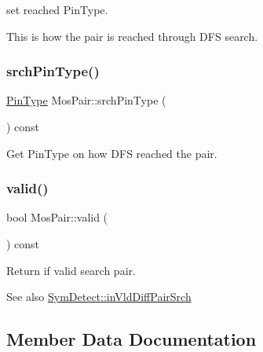 set reached Pin\+Type. 

This is how the pair is reached through D\+FS search. \mbox{\label{classMosPair_a85a281d835a1046346b621ac6c3c6770}} 
\subsubsection{\texorpdfstring{srch\+Pin\+Type()}{srchPinType()}}
{\footnotesize\ttfamily \hyperlink{type_8h_afaab50027002ecbb6c8ac27e727d1bb4}{Pin\+Type} Mos\+Pair\+::srch\+Pin\+Type (\begin{DoxyParamCaption}{ }\end{DoxyParamCaption}) const\hspace{0.3cm}{\ttfamily [inline]}}



Get Pin\+Type on how D\+FS reached the pair. 

\mbox{\label{classMosPair_a16696e5a4fa38118f88549dfc782ac22}} 
\subsubsection{\texorpdfstring{valid()}{valid()}}
{\footnotesize\ttfamily bool Mos\+Pair\+::valid (\begin{DoxyParamCaption}{ }\end{DoxyParamCaption}) const\hspace{0.3cm}{\ttfamily [inline]}}



Return if valid search pair. 

\begin{DoxySeeAlso}{See also}
\hyperlink{classSymDetect_ae6a1ba27f6768f215cba0623b6e2ce08}{Sym\+Detect\+::in\+Vld\+Diff\+Pair\+Srch} 
\end{DoxySeeAlso}


\subsection{Member Data Documentation}
\mbox{\label{classMosPair_a783f254c414a4b746eadbb9d2e49281b}} 

